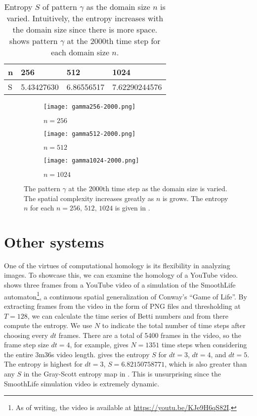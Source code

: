\begin{table}[h]
	\caption{Entropy $S$ of pattern $\gamma$ as the domain size $n$ is varied. Intuitively, the entropy increases with the domain size since there is more space.  shows pattern $\gamma$ at the 2000th time step for each domain size $n$.} \label{tab:gamma_domain}
	\centering
	\renewcommand{\arraystretch}{1.5}
	\begin{tabular}{l | l l l }
	n	& 256			& 512			& 1024 \\
	\hline
	S	& 5.43427630		& 6.86556517		& 7.62290244576
	\end{tabular}
\end{table}%
%
\begin{figure}[h!]
	\centering
	\begin{subfigure}[b]{0.3\textwidth}
		\texttt{[image: gamma256-2000.png]}
		\caption{$n = 256$} \label{fig:gamma256-1000}
	\end{subfigure} \quad
	\begin{subfigure}[b]{0.3\textwidth}
		\texttt{[image: gamma512-2000.png]}
		\caption{$n = 512$} \label{fig:gamma512-1000}
	\end{subfigure} \quad
	\begin{subfigure}[b]{0.3\textwidth}
		\texttt{[image: gamma1024-2000.png]}
		\caption{$n = 1024$} \label{fig:gamma1024-1000}
	\end{subfigure}
	\caption{The pattern $\gamma$ at the 2000th time step as the domain size is varied. The spatial complexity increases greatly as $n$ is grows. The entropy $n$ for each $n = 256,\, 512,\, 1024$ is given in .} \label{fig:gamma_domain}
\end{figure}

\section{Other systems}

One of the virtues of computational homology is its flexibility in analyzing images. To showcase this, we can examine the homology of a YouTube video.  shows three frames from a YouTube video of a simulation of the SmoothLife automaton\footnote{As of writing, the video is available at \url{https://youtu.be/KJe9H6qS82I}.}, a continuous spatial generalization of Conway's ``Game of Life''. By extracting frames from the video in the form of PNG files and thresholding at $T = 128$, we can calculate the time series of Betti numbers and from there compute the entropy. We use $N$ to indicate the total number of time steps after choosing every $dt$ frames. There are a total of 5400 frames in the video, so the frame step size $dt = 4$, for example, gives $N = 1351$ time steps when considering the entire 3m36s video length.  gives the entropy $S$ for $dt = 3$, $dt = 4$, and $dt = 5$. The entropy is highest for $dt = 3$, $S = 6.82150758771$, which is also greater than any $S$ in the Gray-Scott entropy map in . This is unsurprising since the SmoothLife simulation video is extremely dynamic.

